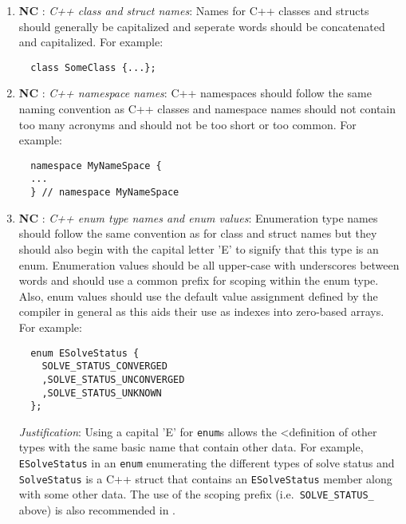 \begin{enumerate}


{}\item{}\textbf{NC }:
{}\textit{C++ class and struct names}: Names for C++ classes and structs
should generally be capitalized and seperate words should be concatenated and
capitalized.  For example:

{\small\begin{verbatim}
  class SomeClass {...};
\end{verbatim}}

{}\item{}\textbf{NC }:
{}\textit{C++ namespace names}: C++ namespaces should follow the same
naming convention as C++ classes and namespace names should not contain too
many acronyms and should not be too short or too common.  For example:

{\small\begin{verbatim}
  namespace MyNameSpace {
  ...
  } // namespace MyNameSpace 
\end{verbatim}}

{}\item{}\textbf{NC }:
{}\textit{C++ enum type names and enum values}: Enumeration type names
should follow the same convention as for class and struct names but they
should also begin with the capital letter 'E' to signify that this type is an
enum.  Enumeration values should be all upper-case with underscores between
words and should use a common prefix for scoping within the enum type.  Also,
enum values should use the default value assignment defined by the compiler in
general as this aids their use as indexes into zero-based arrays.  For
example:

{\small\begin{verbatim}
  enum ESolveStatus {
    SOLVE_STATUS_CONVERGED
    ,SOLVE_STATUS_UNCONVERGED
    ,SOLVE_STATUS_UNKNOWN
  };
\end{verbatim}}

{}\textit{Justification}: Using a capital 'E' for {}\texttt{enum}s allows the
<definition of other types with the same basic name that contain other data.
For example, {}\texttt{ESolveStatus} in an {}\texttt{enum} enumerating the
different types of solve status and {}\texttt{SolveStatus} is a C++ struct
that contains an {}\texttt{ESolveStatus} member along with some other data.
The use of the scoping prefix (i.e.\ {}\texttt{SOLVE\-\_STATUS\_} above) is
also recommended in {}\cite[Section 11.4]{CodeComplete2nd04}.


\end{enumerate}
